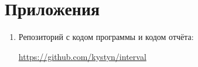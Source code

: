 \section{Приложения} \label{app}

\begin{enumerate}
	\item Репозиторий с кодом программы и кодом отчёта:
	
	\href{https://github.com/kystyn/interval}{https://github.com/kystyn/interval}
\end{enumerate}